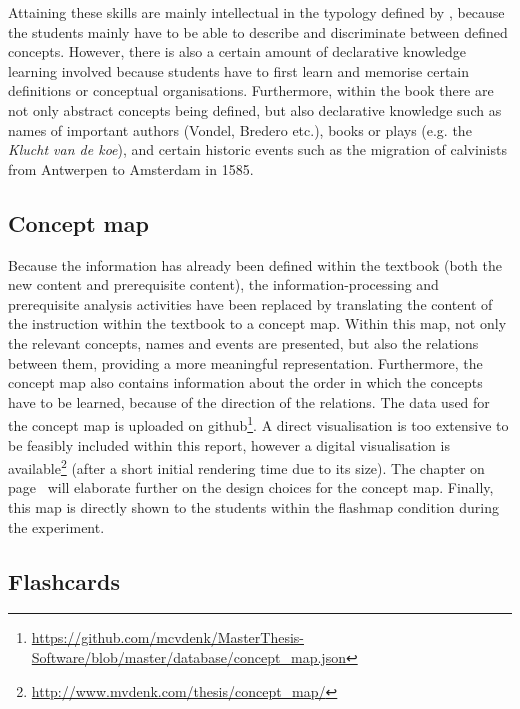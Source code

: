 Attaining these skills are mainly intellectual in the typology defined by , because the students mainly have to be able to describe and discriminate between defined concepts. However, there is also a certain amount of declarative knowledge learning involved because students have to first learn and memorise certain definitions or conceptual organisations. Furthermore, within the book there are not only abstract concepts being defined, but also declarative knowledge such as names of important authors (Vondel, Bredero etc.), books or plays (e.g. the \emph{Klucht van de koe}), and certain historic events such as the migration of calvinists from Antwerpen to Amsterdam in 1585.

\subsection{Concept map}

Because the information has already been defined within the textbook (both the new content and prerequisite content), the information-processing and prerequisite analysis activities have been replaced by translating the content of the instruction within the textbook to a concept map. Within this map, not only the relevant concepts, names and events are presented, but also the relations between them, providing a more meaningful representation. Furthermore, the concept map also contains information about the order in which the concepts have to be learned, because of the direction of the relations. The data used for the concept map is uploaded on github\footnote{\url{https://github.com/mcvdenk/MasterThesis-Software/blob/master/database/concept_map.json}}. A direct visualisation is too extensive to be feasibly included within this report, however a digital visualisation is available\footnote{\url{http://www.mvdenk.com/thesis/concept_map/}} (after a short initial rendering time due to its size). The  chapter on page~\pageref{ch:client} will elaborate further on the design choices for the concept map. Finally, this map is directly shown to the students within the flashmap condition during the experiment.

\subsection{Flashcards}

